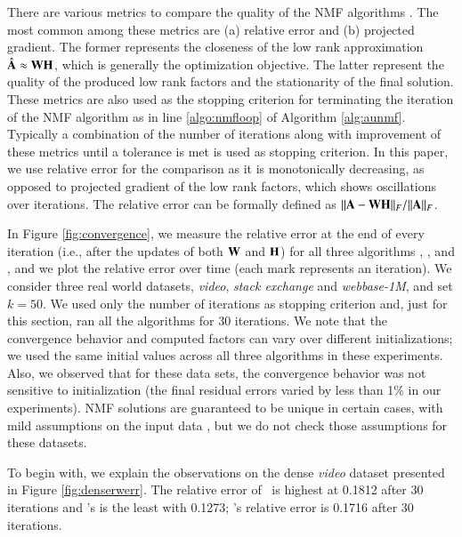 There are various metrics to compare the quality of the 
NMF algorithms \cite{kim2013nonnegative}. The most common among these metrics are (a) relative error and (b) projected 
gradient. The former represents the closeness of the low rank approximation $\hat{\mathbf{A}}\approx\mathbf{W}\mathbf{H}$, which is generally the optimization objective. 
The latter 
represent the quality of the produced low rank factors and the stationarity of the final solution. These 
metrics are also used as the stopping criterion for terminating the iteration of the NMF algorithm as in 
line \ref{algo:nmfloop} of Algorithm \ref{alg:aunmf}. Typically a combination of the number of iterations 
along with improvement of these metrics until a tolerance is met is used as stopping criterion. In this paper, we use 
relative error for the comparison as it is monotonically decreasing, as opposed to projected gradient of the 
low rank factors, which shows oscillations over iterations. The relative error can be formally defined as 
$\|\mathbf{A}-\mathbf{W}\mathbf{H}\|_F/\|\mathbf{A}\|_F$. 

In Figure \ref{fig:convergence}, we measure the relative error at the end of every iteration (i.e., after the updates of both $\mathbf{W}$ and $\mathbf{H}$) for all three algorithms \MU, \HALS, and 
\BPP, and we plot the relative error over time (each mark represents an iteration).
We consider three real world datasets, \emph{video}, \emph{stack exchange} and \emph{webbase-1M}, and set $k=50$. 
We used only the number of iterations as stopping criterion and,  
just for this section, ran all the algorithms for 30 iterations. 
We note that the convergence behavior and computed factors can vary over different initializations; we used the same initial values across all three algorithms in these experiments.
Also, we observed that for these data sets, the convergence behavior was not sensitive to initialization (the final residual errors varied by less than 1\% in our experiments).
NMF solutions are guaranteed to be unique in certain cases, with mild assumptions on the input data \cite{BLRG14,HFS2016}, but we do not check those assumptions for these datasets.

To begin with, we explain the observations on the dense \emph{video} dataset presented in Figure \ref{fig:denserwerr}. 
The relative error of \MU\ is highest at 0.1812 after 30 iterations and \HALS's is the least with 0.1273; \BPP's relative error
is  0.1716 after 30 iterations. 

